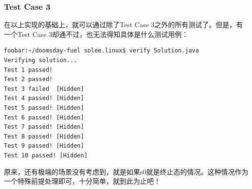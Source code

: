 \documentclass[12pt]{article}
\begin{document}
\subsubsection{Test Case 3}\label{test-case-3}

在以上实现的基础上，就可以通过除了Test Case 3之外的所有测试了。但是，有一个Test Case 3却通不过，也无法得知具体是什么测试用例：

\begin{verbatim}
foobar:~/doomsday-fuel solee.linux$ verify Solution.java 
Verifying solution...
Test 1 passed!
Test 2 passed!
Test 3 failed  [Hidden]
Test 4 passed! [Hidden]
Test 5 passed! [Hidden]
Test 6 passed! [Hidden]
Test 7 passed! [Hidden]
Test 8 passed! [Hidden]
Test 9 passed! [Hidden]
Test 10 passed! [Hidden]
\end{verbatim}

原来，还有极端的场景没有考虑到，就是如果s0就是终止态的情况。这种情况作为一个特殊前提处理即可，十分简单，就到此为止吧！
\end{document}
